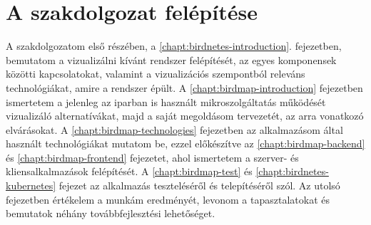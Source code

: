 \section{A szakdolgozat felépítése}
A szakdolgozatom első részében, a \ref{chapt:birdnetes-introduction}. fejezetben, bemutatom a vizualizálni kívánt rendszer felépítését, az egyes komponensek közötti kapcsolatokat,
valamint a vizualizációs szempontból releváns technológiákat, amire a rendszer épült.
A \ref{chapt:birdmap-introduction} fejezetben ismertetem a jelenleg az iparban is használt mikroszolgáltatás működését vizualizáló alternatívákat, majd a saját megoldásom tervezetét, az arra vonatkozó elvárásokat.
A \ref{chapt:birdmap-technologies} fejezetben az alkalmazásom által használt technológiákat mutatom be, 
ezzel előkészítve az \ref{chapt:birdmap-backend} és \ref{chapt:birdmap-frontend} fejezetet, ahol ismertetem a szerver- és kliensalkalmazások felépítését.
A \ref{chapt:birdmap-test} és \ref{chapt:birdnetes-kubernetes} fejezet az alkalmazás teszteléséről és telepítéséről szól.
Az utolsó fejezetben értékelem a munkám eredményét, levonom a tapasztalatokat és bemutatok néhány továbbfejlesztési lehetőséget.